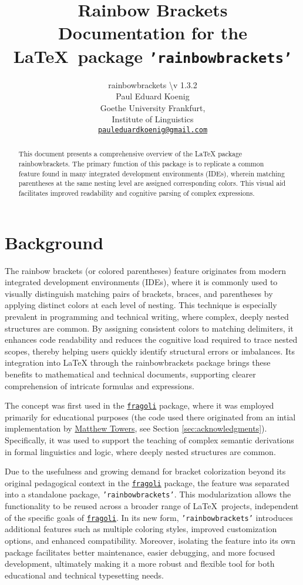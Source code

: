 \documentclass[10pt, a4paper]{article}
\title{Rainbow Brackets\\Documentation for the \LaTeX\ package \texttt{'rainbowbrackets'}}
\author{rainbowbrackets \textbackslash v 1.3.2\\Paul Eduard Koenig\\Goethe University Frankfurt,\\Institute of Linguistics\\\texttt{\href{mailto:pauleduardkoenig@gmail.com}{pauleduardkoenig@gmail.com}}}
\begin{document}
	\maketitle
	\begin{abstract}
		\noindent This document presents a comprehensive overview of the LaTeX package rainbowbrackets. The primary function of this package is to replicate a common feature found in many integrated development environments (IDEs), wherein matching parentheses at the same nesting level are assigned corresponding colors. This visual aid facilitates improved readability and cognitive parsing of complex expressions.
	\end{abstract}
	\tableofcontents
	\section{Background}
	The rainbow brackets (or colored parentheses) feature originates from modern integrated development environments (IDEs), where it is commonly used to visually distinguish matching pairs of brackets, braces, and parentheses by applying distinct colors at each level of nesting. This technique is especially prevalent in programming and technical writing, where complex, deeply nested structures are common. By assigning consistent colors to matching delimiters, it enhances code readability and reduces the cognitive load required to trace nested scopes, thereby helping users quickly identify structural errors or imbalances. Its integration into LaTeX through the rainbowbrackets package brings these benefits to mathematical and technical documents, supporting clearer comprehension of intricate formulas and expressions.
	
	The concept was first used in the \texttt{\href{https://ctan.org/pkg/fragoli}{fragoli}} package, where it was employed primarily for educational purposes (the code used there originated from an intial implementation by \href{https://github.com/matthew-towers}{Matthew Towers}, see Section \ref{sec:acknowledgments}). Specifically, it was used to support the teaching of complex semantic derivations in formal linguistics and logic, where deeply nested structures are common. 
	
	Due to the usefulness and growing demand for bracket colorization beyond its original pedagogical context in the \texttt{\href{https://ctan.org/pkg/fragoli}{fragoli}} package, the feature was separated into a standalone package, \texttt{'rainbowbrackets'}. This modularization allows the functionality to be reused across a broader range of \LaTeX\ projects, independent of the specific goals of \texttt{\href{https://ctan.org/pkg/fragoli}{fragoli}}. In its new form, \texttt{'rainbowbrackets'} introduces additional features such as multiple coloring styles, improved customization options, and enhanced compatibility. Moreover, isolating the feature into its own package facilitates better maintenance, easier debugging, and more focused development, ultimately making it a more robust and flexible tool for both educational and technical typesetting needs.
	
\end{document}
